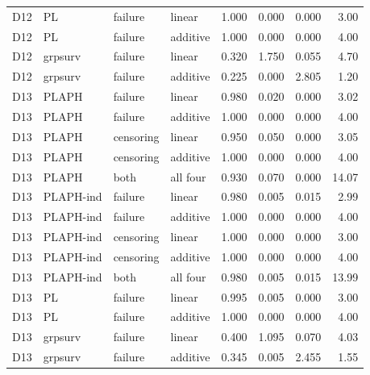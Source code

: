 \begin{longtable}{clllrrrr}
D12 & PL & failure & linear & 1.000 & 0.000 & 0.000 & 3.00 \\
D12 & PL & failure & additive & 1.000 & 0.000 & 0.000 & 4.00 \\
D12 & grpsurv & failure & linear & 0.320 & 1.750 & 0.055 & 4.70 \\
D12 & grpsurv & failure & additive & 0.225 & 0.000 & 2.805 & 1.20 \\
D13 & PLAPH & failure & linear & 0.980 & 0.020 & 0.000 & 3.02 \\
D13 & PLAPH & failure & additive & 1.000 & 0.000 & 0.000 & 4.00 \\
D13 & PLAPH & censoring & linear & 0.950 & 0.050 & 0.000 & 3.05 \\
D13 & PLAPH & censoring & additive & 1.000 & 0.000 & 0.000 & 4.00 \\
D13 & PLAPH & both & all four & 0.930 & 0.070 & 0.000 & 14.07 \\
D13 & PLAPH-ind & failure & linear & 0.980 & 0.005 & 0.015 & 2.99 \\
D13 & PLAPH-ind & failure & additive & 1.000 & 0.000 & 0.000 & 4.00 \\
D13 & PLAPH-ind & censoring & linear & 1.000 & 0.000 & 0.000 & 3.00 \\
D13 & PLAPH-ind & censoring & additive & 1.000 & 0.000 & 0.000 & 4.00 \\
D13 & PLAPH-ind & both & all four & 0.980 & 0.005 & 0.015 & 13.99 \\
D13 & PL & failure & linear & 0.995 & 0.005 & 0.000 & 3.00 \\
D13 & PL & failure & additive & 1.000 & 0.000 & 0.000 & 4.00 \\
D13 & grpsurv & failure & linear & 0.400 & 1.095 & 0.070 & 4.03 \\
D13 & grpsurv & failure & additive & 0.345 & 0.005 & 2.455 & 1.55 \\
\end{longtable}


